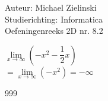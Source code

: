 \documentclass[a4paper]{article}
\begin{document}
  
\noindent \large Auteur: Michael Zielinski \\
\noindent \large Studierichting: Informatica\\
\noindent \large Oefeningenreeks 2D nr. 8.2\\

\medskip

\normalsize

$\lim\limits_{x\rightarrow\infty} \left(-x^2-\dfrac{1}{2}x \right)$ \\


$= \lim\limits_{x\rightarrow\infty} \left(-x^2 \right) = -\infty$ \\

\begin{thebibliography}{999}
\end{thebibliography}
\end{document}
